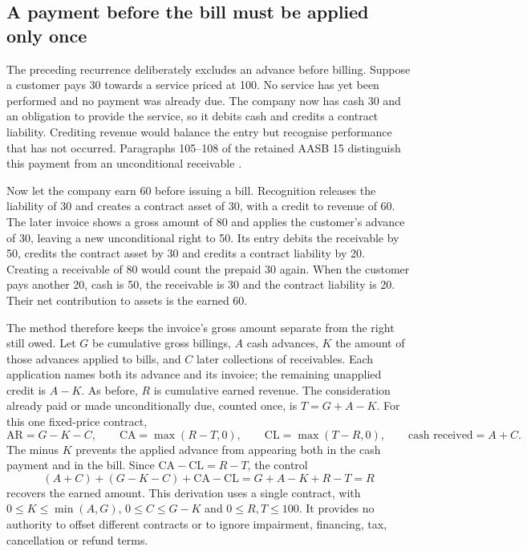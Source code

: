 \subsection{A payment before the bill must be applied only once}
\label{sec:customer-advance}

The preceding recurrence deliberately excludes an advance before billing.
Suppose a customer pays 30 towards a service priced at 100. No service has yet
been performed and no payment was already due. The company now has cash 30 and
an obligation to provide the service, so it debits cash and credits a contract
liability. Crediting revenue would balance the entry but recognise performance
that has not occurred. Paragraphs 105--108 of the retained AASB 15 distinguish
this payment from an unconditional receivable \citep{aasb15dated}.

Now let the company earn 60 before issuing a bill. Recognition releases the
liability of 30 and creates a contract asset of 30, with a credit to revenue
of 60. The later invoice shows a gross amount of 80 and applies the customer's
advance of 30, leaving a new unconditional right to 50. Its entry debits the
receivable by 50, credits the contract asset by 30 and credits a contract
liability by 20. Creating a receivable of 80 would count the prepaid 30 again.
When the customer pays another 20, cash is 50, the receivable is 30 and the
contract liability is 20. Their net contribution to assets is the earned 60.

The method therefore keeps the invoice's gross amount separate from the right
still owed. Let $G$ be cumulative gross billings, $A$ cash advances, $K$ the
amount of those advances applied to bills, and $C$ later collections of
receivables. Each application names both its advance and its invoice; the
remaining unapplied credit is $A-K$. As before, $R$ is cumulative earned
revenue. The consideration already paid or made unconditionally due, counted
once, is $T=G+A-K$. For this one fixed-price contract,
\[
 \mathrm{AR}=G-K-C,\qquad
 \mathrm{CA}=\max(R-T,0),\qquad
 \mathrm{CL}=\max(T-R,0),\qquad
 \text{cash received}=A+C.
\]
The minus $K$ prevents the applied advance from appearing both in the cash
payment and in the bill. Since $\mathrm{CA}-\mathrm{CL}=R-T$, the control
\[
 (A+C)+(G-K-C)+\mathrm{CA}-\mathrm{CL}
 =G+A-K+R-T=R
\]
recovers the earned amount. This derivation uses a single contract, with
$0\leq K\leq\min(A,G)$, $0\leq C\leq G-K$ and $0\leq R,T\leq100$.
It provides no authority to offset different contracts or to ignore impairment,
financing, tax, cancellation or refund terms.

